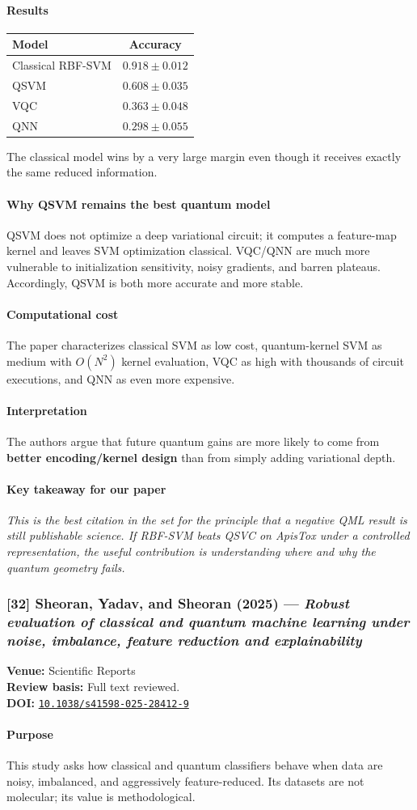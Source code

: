 \documentclass[11pt]{article}
\newcommand{\reviewfield}[2]{\paragraph{#1}#2}
\newcommand{\keytakeaway}[1]{\paragraph{Key takeaway for our paper}\emph{#1}}
\newcommand{\paperdoi}[1]{\href{https://doi.org/#1}{\texttt{#1}}}
\begin{document}
\reviewfield{Results}{
\begin{center}
\begin{tabular}{lc}
\toprule
Model & Accuracy\\
\midrule
Classical RBF-SVM & $0.918\pm0.012$\\
QSVM & $0.608\pm0.035$\\
VQC & $0.363\pm0.048$\\
QNN & $0.298\pm0.055$\\
\bottomrule
\end{tabular}
\end{center}
The classical model wins by a very large margin even though it receives exactly the same reduced information.
}

\reviewfield{Why QSVM remains the best quantum model}{
QSVM does not optimize a deep variational circuit; it computes a feature-map kernel and leaves SVM optimization classical. VQC/QNN are much more vulnerable to initialization sensitivity, noisy gradients, and barren plateaus. Accordingly, QSVM is both more accurate and more stable.
}

\reviewfield{Computational cost}{
The paper characterizes classical SVM as low cost, quantum-kernel SVM as medium with $O(N^2)$ kernel evaluation, VQC as high with thousands of circuit executions, and QNN as even more expensive.
}

\reviewfield{Interpretation}{
The authors argue that future quantum gains are more likely to come from \textbf{better encoding/kernel design} than from simply adding variational depth.
}

\keytakeaway{This is the best citation in the set for the principle that a negative QML result is still publishable science. If RBF-SVM beats QSVC on ApisTox under a controlled representation, the useful contribution is understanding where and why the quantum geometry fails.}

\subsubsection{[32] Sheoran, Yadav, and Sheoran (2025) --- \textit{Robust evaluation of classical and quantum machine learning under noise, imbalance, feature reduction and explainability}}
\textbf{Venue:} Scientific Reports\\
\textbf{Review basis:} Full text reviewed.\\
\textbf{DOI:} \paperdoi{10.1038/s41598-025-28412-9}

\reviewfield{Purpose}{
This study asks how classical and quantum classifiers behave when data are noisy, imbalanced, and aggressively feature-reduced. Its datasets are not molecular; its value is methodological.
}
\end{document}
